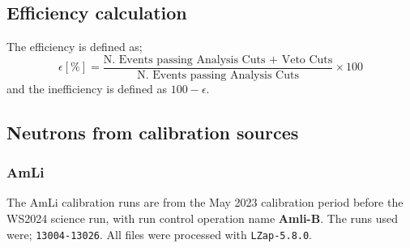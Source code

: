 \subsection{Efficiency calculation}
The efficiency is defined as;
\begin{equation}
	\epsilon [\%] = \frac{\textrm{N. Events passing Analysis Cuts + Veto Cuts}}{\textrm{N. Events passing Analysis Cuts}} \times 100
	\label{eq:neutron_tagging_efficiency}
\end{equation}
and the inefficiency is defined as $100 - \epsilon$.

\subsection{Neutrons from calibration sources \label{sec:Veto/AmLi_Efficiency}}
\subsubsection{AmLi}
The AmLi calibration runs are from the May 2023 calibration period before the WS2024 science run, with run control operation name \textbf{Amli-B}.
The runs used were; \lstinline{13004-13026}.
All files were processed with \lstinline{LZap-5.8.0}.

